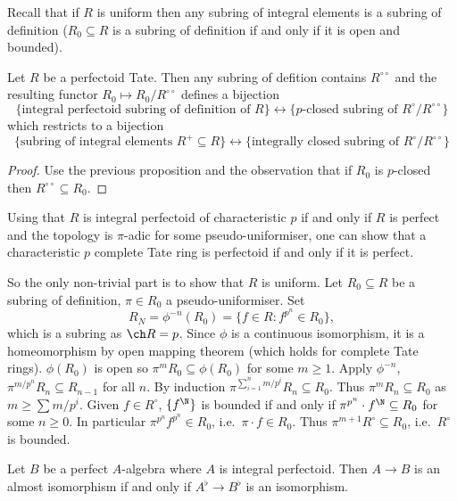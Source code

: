 \documentclass[a4paper]{article}
\newcommand{\tilt}{\flat} %
\begin{document}
Recall that if \(R\) is uniform then any subring of integral elements is a subring of definition (\(R_0 \subseteq R\) is a subring of definition if and only if it is open and bounded).

\begin{corollary}
  Let \(R\) be a perfectoid Tate. Then any subring of defition contains \(R^{\circ \circ}\) and the resulting functor \(R_0 \mapsto R_0/R^{\circ \circ}\) defines a bijection
  \[
    \{\text{integral perfectoid subring of definition of } R\}
    \longleftrightarrow
    \{\text{\(p\)-closed subring of } R^\circ/R^{\circ \circ}\}
  \]
  which restricts to a bijection
  \[
    \{\text{subring of integral elements } R^+ \subseteq R\}
    \longleftrightarrow
    \{\text{integrally closed subring of } R^\circ/R^{\circ \circ}\}
  \]
\end{corollary}

\begin{proof}
  Use the previous proposition and the observation that if \(R_0\) is \(p\)-closed then \(R^{\circ \circ} \subseteq R_0\).
\end{proof}

\begin{remark}
  Using that \(R\) is integral perfectoid of characteristic \(p\) if and only if \(R\) is perfect and the topology is \(\pi\)-adic for some pseudo-uniformiser, one can show that a characteristic \(p\) complete Tate ring is perfectoid if and only if it is perfect.

  So the only non-trivial part is to show that \(R\) is uniform. Let \(R_0 \subseteq R\) be a subring of definition, \(\pi \in R_0\) a pseudo-uniformiser. Set
  \[
    R_N = \phi^{-n}(R_0) = \{f \in R: f^{p^n} \in R_0\},
  \]
  which is a subring as \(\ch R = p\). Since \(\phi\) is a continuous isomorphism, it is a homeomorphism by open mapping theorem (which holds for complete Tate rings). \(\phi(R_0)\) is open so \(\pi^m R_0 \subseteq \phi(R_0)\) for some \(m \geq 1\). Apply \(\phi^{-n}\), \(\pi^{m/p^n} R_n \subseteq R_{n - 1}\) for all \(n\). By induction \(\pi^{\sum_{i = 1}^n m/p^i} R_n \subseteq R_0\). Thus \(\pi^m R_n \subseteq R_0\) as \(m \geq \sum m/p^i\). Given \(f \in R^\circ\), \(\{f^\N\}\) is bounded if and only if \(\pi^{p^n} \cdot f^\N \subseteq R_0\) for some \(n \geq 0\). In particular \(\pi^{p^n} f^{p^n} \in R_0\), i.e.\ \(\pi \cdot f \in R_0\). Thus \(\pi^{m + 1} R^\circ \subseteq R_0\), i.e.\ \(R^\circ\) is bounded.
\end{remark}

\begin{lemma}
  Let \(B\) be a perfect \(A\)-algebra where \(A\) is integral perfectoid. Then \(A \to B\) is an almost isomorphism if and only if \(A^\tilt \to B^\tilt\) is an isomorphism.
\end{lemma}
\end{document}
